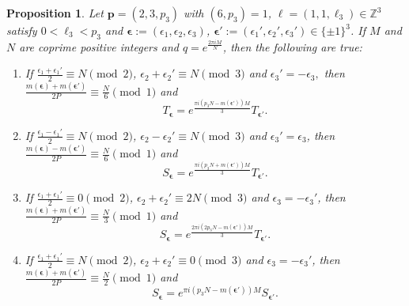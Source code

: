 \documentclass[11pt,reqno]{amsart}
\newtheorem{proposition}[theorem]{Proposition}
\theoremstyle{definition}
\numberwithin{equation}{section}
\renewcommand{\=}{\;=\;}
\begin{document}
\begin{proposition} \label{pieces1}
Let $\bm{p} = (2,3, p_3)$ with $(6,p_3)=1$, $\bm{\ell} = (1, 1, \ell_3) \in \mathbb{Z}^3$ satisfy $0 < \ell_3 < p_3$ and $\bm \epsilon := (\epsilon_1, \epsilon_2, \epsilon_3)$, $\bm \epsilon' := (\epsilon_1', \epsilon_2', \epsilon_3') \in \{\pm 1\}^3$. If $M$ and $N$ are coprime positive integers and $q= e^{\frac{2\pi i M}{N}}$, then the following are true:
\begin{enumerate}
\item[(i)] If $\frac{\epsilon_1+\epsilon_1'}{2} \equiv N \pmod 2$,
$
\epsilon_2+\epsilon_2' \equiv N \pmod 3$ and $
\epsilon_3' = -\epsilon_3,
$
then $\frac{m(\bm \epsilon)+m(\bm \epsilon')}{2P} \equiv \frac {N} 6 \pmod 1$ and
$$T_{\bm \epsilon} = e^{\frac{\pi i \left( p_3N-m(\bm \epsilon') \right)M}{3}}  T_{\bm \epsilon'}.$$

\item[(ii)] If $\frac{\epsilon_1-\epsilon_1'}{2} \equiv N \pmod 2$,
$\epsilon_2-\epsilon_2' \equiv N \pmod 3$ and $
\epsilon_3' = \epsilon_3$,
then $\frac{m(\bm \epsilon)-m(\bm \epsilon')}{2P} \equiv \frac {N} 6 \pmod 1$ and 
$$S_{\bm \epsilon} = e^{\frac{\pi i \left( p_3N+m(\bm \epsilon') \right)M}{3}} T_{\bm \epsilon'}.$$

\item[(iii)] If $\frac{\epsilon_1+\epsilon_1'}{2} \equiv 0\pmod 2$,
$\epsilon_2 +\epsilon_2' \equiv 2N \pmod 3$ and $\epsilon_3 = -\epsilon_3'$,
then $\frac{m(\bm \epsilon)+m(\bm \epsilon')}{2P}
\equiv \frac {N} 3 \pmod 1$ and 
$$S_{\bm \epsilon} = e^{\frac{2\pi i \left(2p_3N- m(\bm \epsilon') \right)M}{3}} T_{\bm \epsilon'}.$$

\item[(iv)] If $\frac{\epsilon_1+\epsilon_1'}{2} \equiv N \pmod 2$,
$\epsilon_2 +\epsilon_2'\equiv 0 \pmod 3$
 and $\epsilon_3 = -\epsilon_3'$,
then $\frac{m(\bm \epsilon)+m(\bm \epsilon')}{2P}
\equiv \frac {N} 2 \pmod 1$ and
$$S_{\bm \epsilon} =  e^{\pi i \left( p_3N-m(\bm \epsilon') \right)M} S_{\bm \epsilon'}.$$
\end{enumerate}
\end{proposition}
\end{document}
